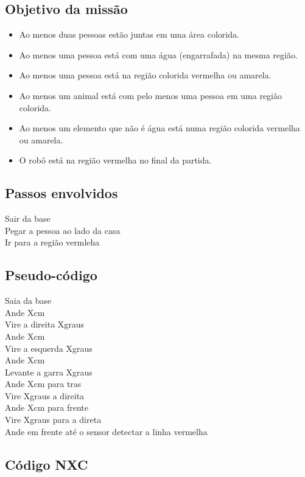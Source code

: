 \documentclass{article}
\begin{document}
	\subsection{Objetivo da missão}
		\begin{itemize}
			\item Ao menos duas pessoas estão juntas em uma área colorida.
			\item Ao menos uma pessoa está com uma água (engarrafada) na mesma região.
			\item Ao menos uma pessoa está na região colorida vermelha ou amarela.
			\item Ao menos um animal está com pelo menos uma pessoa em uma região colorida.
			\item Ao menos um elemento que não é água está numa região colorida vermelha ou amarela.
			\item O robô está na região vermelha no final da partida.
		\end{itemize}

	\subsection{Passos envolvidos}
		Sair da base\\
		Pegar a pessoa ao lado da casa\\
		Ir para a região vermleha\\

	\subsection{Pseudo-código}
		Saia da base\\
		Ande Xcm\\
		Vire a direita Xgraus\\
		Ande Xcm\\
		Vire a esquerda Xgraus\\
		Ande Xcm\\
		Levante a garra Xgraus\\
		Ande Xcm para tras\\
		Vire Xgraus a direita\\
		Ande Xcm para frente\\
		Vire Xgraus para a direta\\
		Ande em frente até o sensor detectar a linha vermelha\\

	\subsection{Código NXC}
		\inputminted[linenos, frame = single]{c}{../ZonaDeSeguranca.nxc}
\end{document}
